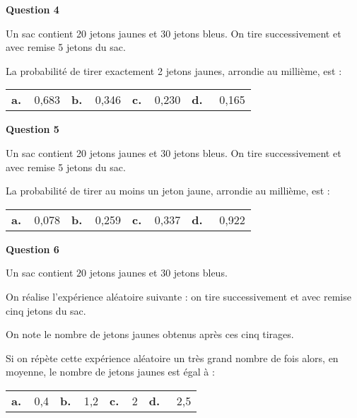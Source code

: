 \documentclass[10pt,a4paper]{article}
\begin{document}
\textbf{Question 4}

\medskip

Un sac contient 20 jetons jaunes et 30 jetons bleus. On tire successivement et avec remise 5 jetons du sac.

La probabilité de tirer exactement 2 jetons jaunes, arrondie au millième, est :

\begin{center}
\begin{tabularx}{\linewidth}{*{4}{X}}
\textbf{a.~~}0,683&\textbf{b.~~}0,346 &\textbf{c.~~}0,230&\textbf{d.~~} 0,165
\end{tabularx}
\end{center}

\medskip

\textbf{Question 5}

\medskip

Un sac contient 20 jetons jaunes et 30 jetons bleus. On tire successivement et avec remise 5 jetons du sac.

La probabilité de tirer au moins un jeton jaune, arrondie au millième, est :

\begin{center}
\begin{tabularx}{\linewidth}{*{4}{X}}
\textbf{a.~~}0,078&\textbf{b.~~}0,259 &\textbf{c.~~}0,337&\textbf{d.~~} 0,922
\end{tabularx}
\end{center}

\medskip

\textbf{Question 6}

\medskip

Un sac contient $20$ jetons jaunes et $30$ jetons bleus.

On réalise l'expérience aléatoire suivante : on tire successivement et avec remise cinq jetons du sac. 

On note le nombre de jetons jaunes obtenus après ces cinq tirages.

Si on répète cette expérience aléatoire un très grand nombre de fois alors, en moyenne, le nombre de jetons jaunes est égal à :

\begin{center}
\begin{tabularx}{\linewidth}{*{4}{X}}
\textbf{a.~~}0,4&\textbf{b.~~}1,2 &\textbf{c.~~}2&\textbf{d.~~} 2,5
\end{tabularx}
\end{center}
\newpage
\hypertarget{Polynesie3}{}
\end{document}

